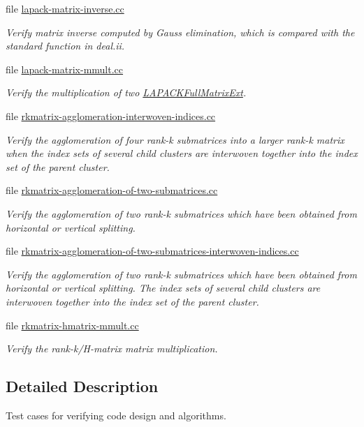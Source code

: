 \begin{DoxyCompactItemize}
file \hyperlink{lapack-matrix-inverse_8cc}{lapack-\/matrix-\/inverse.\+cc}
\begin{DoxyCompactList}\small\item\em Verify matrix inverse computed by Gauss elimination, which is compared with the standard function in deal.\+ii. \end{DoxyCompactList}\item 
file \hyperlink{lapack-matrix-mmult_8cc}{lapack-\/matrix-\/mmult.\+cc}
\begin{DoxyCompactList}\small\item\em Verify the multiplication of two {\ttfamily \hyperlink{classLAPACKFullMatrixExt}{L\+A\+P\+A\+C\+K\+Full\+Matrix\+Ext}}. \end{DoxyCompactList}\item 
file \hyperlink{rkmatrix-agglomeration-interwoven-indices_8cc}{rkmatrix-\/agglomeration-\/interwoven-\/indices.\+cc}
\begin{DoxyCompactList}\small\item\em Verify the agglomeration of four rank-\/k submatrices into a larger rank-\/k matrix when the index sets of several child clusters are interwoven together into the index set of the parent cluster. \end{DoxyCompactList}\item 
file \hyperlink{rkmatrix-agglomeration-of-two-submatrices_8cc}{rkmatrix-\/agglomeration-\/of-\/two-\/submatrices.\+cc}
\begin{DoxyCompactList}\small\item\em Verify the agglomeration of two rank-\/k submatrices which have been obtained from horizontal or vertical splitting. \end{DoxyCompactList}\item 
file \hyperlink{rkmatrix-agglomeration-of-two-submatrices-interwoven-indices_8cc}{rkmatrix-\/agglomeration-\/of-\/two-\/submatrices-\/interwoven-\/indices.\+cc}
\begin{DoxyCompactList}\small\item\em Verify the agglomeration of two rank-\/k submatrices which have been obtained from horizontal or vertical splitting. The index sets of several child clusters are interwoven together into the index set of the parent cluster. \end{DoxyCompactList}\item 
file \hyperlink{rkmatrix-hmatrix-mmult_8cc}{rkmatrix-\/hmatrix-\/mmult.\+cc}
\begin{DoxyCompactList}\small\item\em Verify the rank-\/k/\+H-\/matrix matrix multiplication. \end{DoxyCompactList}\end{DoxyCompactItemize}


\subsection{Detailed Description}
Test cases for verifying code design and algorithms. 

